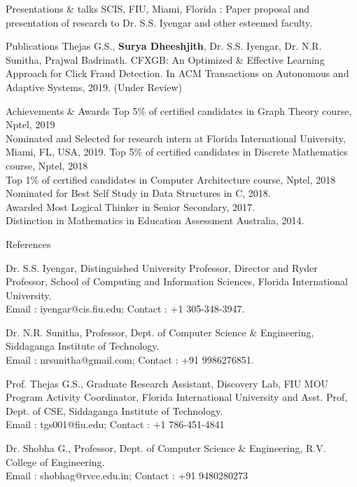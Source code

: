 \documentclass{resume} %
\begin{document}
\begin{rSection}{Presentations \& talks}
SCIS, FIU, Miami, Florida : Paper proposal and presentation of research to Dr. S.S. Iyengar and other esteemed faculty.
\end{rSection}

\begin{rSection}{Publications}
Thejas G.S., {\bf Surya Dheeshjith}, Dr. S.S. Iyengar, Dr. N.R. Sunitha, Prajwal Badrinath. CFXGB:
An Optimized \& Effective Learning Approach for Click Fraud Detection. In ACM Transactions on Autonomous and Adaptive Systems, 2019. (Under Review)
\end{rSection}

\begin{rSection}{Achievements \& Awards} 
Top 5\% of certified candidates in Graph Theory course, Nptel, 2019\\
Nominated and Selected for research intern at Florida International University, Miami, FL, USA, 2019.
Top 5\% of certified candidates in Discrete Mathematics course, Nptel, 2018\\
Top 1\% of certified candidates in Computer Architecture course, Nptel, 2018\\
Nominated for Best Self Study in Data Structures in C, 2018.\\
Awarded Most Logical Thinker in Senior Secondary, 2017.\\
Distinction in Mathematics in Education Assessment Australia, 2014.\\

\end{rSection}

\begin{rSection}{References} 
\item Dr. S.S. Iyengar, Distinguished University Professor, Director and Ryder Professor, School of Computing and Information Sciences, Florida International University. \\Email : iyengar@cis.fiu.edu; Contact : +1 305-348-3947.
\item Dr. N.R. Sunitha, Professor, Dept. of Computer Science \& Engineering, Siddaganga Institute of Technology.
\\Email : nrsunitha@gmail.com; Contact : +91 9986276851.
\item Prof. Thejas G.S., Graduate Research Assistant, Discovery 
Lab, FIU MOU Program Activity Coordinator, Florida International University and Asst. Prof, Dept. of CSE, Siddaganga Institute of Technology.\\ Email : tgs001@fiu.edu; Contact : +1 786-451-4841
\item Dr. Shobha G., Professor, Dept. of Computer Science \& Engineering, R.V. College of Engineering.\\
Email : shobhag@rvce.edu.in; Contact : +91 9480280273
\end{rSection}
\end{document}
